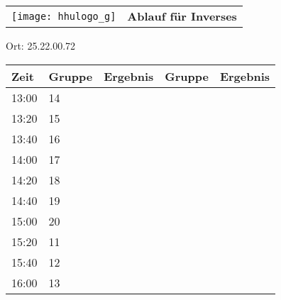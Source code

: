 \documentclass[a4paper,10pt]{article}
\def\spield{Inverses}
\def\raumdd{25.22.00.72}
\begin{document}
  \begin{tabularx}{\textwidth}{lc}
    \texttt{[image: hhulogo\_g]}
  & {\Huge \textbf{Ablauf für \spield}}
  \end{tabularx}
  \LARGE
  \begin{center}
    \vspace{1cm} 
    Ort: \raumdd
  \end{center}
    \vspace{2cm} 
    \begin{tabularx}{\textwidth}{X||X|X||X|X}
	\textbf{Zeit} &\textbf{Gruppe} & \textbf{Ergebnis} &\textbf{Gruppe} & \textbf{Ergebnis}  	\\ \hline \hline
	13:00 &	14	&	&	&	\\ \hline
	13:20 &	15	&	&	&	\\ \hline
	13:40 &	16	&	&	&	\\ \hline

	14:00 &	17	&	&	&	\\ \hline
	14:20 &	18	&	&	&	\\ \hline
	14:40 &	19	&	&	&	\\ \hline

	15:00 &	20	&	&	&	\\ \hline
	15:20 &	11	&	&	&	\\ \hline
	15:40 &	12	&	&	&	\\ \hline

	16:00 &	13	&	&	&	\\ \hline
      
    \end{tabularx}
   
\end{document}
